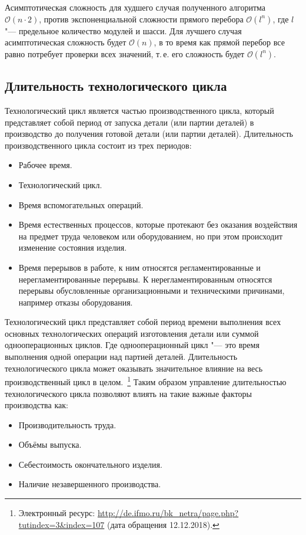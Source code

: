 Асимптотическая сложность для худшего случая полученного алгоритма $\mathcal{O}(n \cdot 2)$, против экспоненциальной сложности прямого перебора $\mathcal{O}(l^n)$, где $l$ "--- предельное количество модулей и шасси.
Для лучшего случая асимптотическая сложность будет $\mathcal{O}(n)$, в то время как прямой перебор все равно потребует проверки всех значений, т.\,е. его сложность будет $\mathcal{O}(l^n)$.


\subsection{Длительность технологического цикла}

Технологический цикл является частью производственного цикла, который представляет собой период от запуска детали (или партии деталей) в производство до получения готовой детали (или партии деталей). Длительность производственного цикла состоит из трех периодов:

\begin{itemize}
	\item Рабочее время.
	\item Технологический цикл.
	\item Время вспомогательных операций.
	\item Время естественных процессов, которые протекают без оказания воздействия на предмет труда человеком или оборудованием, но при этом происходит изменение состояния изделия.
	\item Время перерывов в работе, к ним относятся регламентированные и нерегламентированные перерывы. К нерегламентированным относятся перерывы обусловленные организационными и техническими причинами, например отказы оборудования.
\end{itemize}

Технологический цикл представляет собой период времени выполнения  всех основных технологических операций изготовления детали или суммой однооперационных циклов. Где однооперационный цикл "--- это время выполнения одной операции над партией деталей. Длительность технологического цикла может оказывать значительное влияние на весь производственный цикл в целом.~\footnote{Электронный ресурс: {\tiny\url{http://de.ifmo.ru/bk_netra/page.php?tutindex=3&index=107}} (дата обращения 12.12.2018).} Таким образом управление длительностью технологического цикла позволяют влиять на такие важные факторы производства как:

\begin{itemize}
	\item Производительность труда.
	\item Объёмы выпуска.
	\item Себестоимость окончательного изделия.
	\item Наличие незавершенного производства.
\end{itemize}

